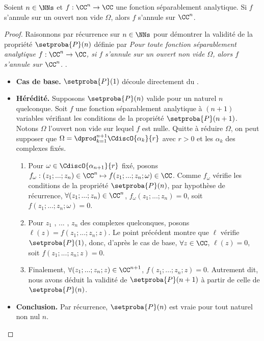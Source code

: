 \begin{fact} \label{sep-isolated-zero}
    Soient $n \in \NNs$
    et
    $f: \CC^n \rightarrow \CC$ une fonction séparablement analytique.
	Si $f$ s'annule sur un ouvert non vide $\Omega$,
	alors $f$ s'annule sur $\CC^n$. 
\end{fact}


\begin{proof}
	Raisonnons par récurrence sur $n \in \NNs$ pour démontrer la validité de la propriété $\setproba{P}(n)$ définie par
	\emph{\og 
		Pour toute fonction séparablement analytique $f: \CC^n \rightarrow \CC$,
		si $f$ s'annule sur un ouvert non vide $\Omega$,
		alors $f$ s'annule sur $\CC^n$. 
	\fg}\kern2pt.
	\begin{itemize}[label=\small\textbullet]
		\item \textbf{Cas de base.}
		$\setproba{P}(1)$ découle directement du .


		\item \textbf{Hérédité.}
		Supposons $\setproba{P}(n)$ valide pour un naturel $n$ quelconque.
		Soit $f$ une fonction séparablement analytique à $(n + 1)$ variables vérifiant les conditions de la propriété $\setproba{P}(n + 1)$.
		Notons $\Omega$ l'ouvert non vide sur lequel $f$ est nulle.
		Quitte à réduire $\Omega$, on peut supposer que
		$\Omega = \dprod_{k=1}^{n+1} \CdiscO{\alpha_k}{r}$
		avec $r > 0$ et les $\alpha_k$ des complexes fixés.
		\begin{enumerate}
		    \item Pour $\omega \in \CdiscO{\alpha_{n+1}}{r}$ fixé,
		    posons
		    $f_\omega: (z_1 ; ... ; z_n) \in \CC^n \mapsto f(z_1 ; ... ; z_n ; \omega) \in \CC$.
		    Comme $f_\omega$ vérifie les conditions de la propriété $\setproba{P}(n)$, par hypothèse de récurrence,
		    $\forall (z_1 ; ... ; z_n) \in  \CC^n$,
		    $f_\omega(z_1 ; ... ; z_n) = 0$, 
		    soit $f(z_1 ; ... ; z_n ; \omega) = 0$.


		    \item Pour $z_1$ , ... , $z_n$ des complexes quelconques,
		    posons $\ell(z) = f(z_1 ; ... ; z_n ; z)$.
		    Le point précédent montre que $\ell$ vérifie $\setproba{P}(1)$,
		    donc, d'après le cas de base,
		    $\forall z \in \CC$,
		    $\ell(z) = 0$,
		    soit $f(z_1 ; ... ; z_n ; z) = 0$.


		    \item Finalement,
		    $\forall (z_1 ; ... ; z_n ; z) \in  \CC^{n+1}$,
		    $f(z_1 ; ... ; z_n ; z) = 0$.
		    Autrement dit, nous avons déduit la validité de $\setproba{P}(n+1)$ à partir de celle de $\setproba{P}(n)$.
		\end{enumerate}
		
		
		\item \textbf{Conclusion.}
		Par récurrence, $\setproba{P}(n)$ est vraie pour tout naturel non nul $n$.
	\end{itemize}

	\null\vspace{-5.75ex}
\end{proof}

